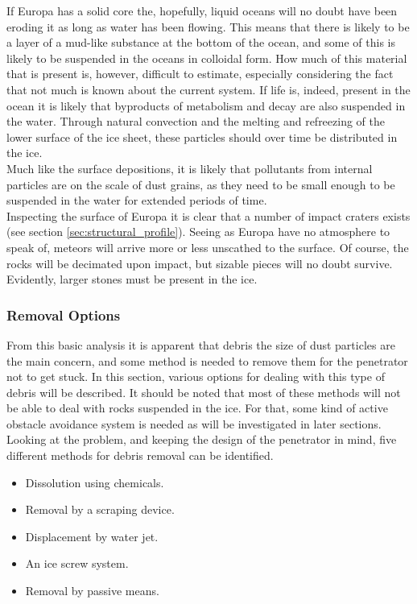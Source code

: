 \noindent
If Europa has a solid core the, hopefully, liquid oceans will no doubt have been eroding it as long as water has been flowing. This means that there is likely to be a layer of a mud-like substance at the bottom of the ocean, and some of this is likely to be suspended in the oceans in colloidal form. How much of this material that is present is, however, difficult to estimate, especially considering the fact that not much is known about the current system. If life is, indeed, present in the ocean it is likely that byproducts of metabolism and decay are also suspended in the water. Through natural convection and the melting and refreezing of the lower surface of the ice sheet, these particles should over time be distributed in the ice. \\
Much like the surface depositions, it is likely that pollutants from internal particles are on the scale of dust grains, as they need to be small enough to be suspended in the water for extended periods of time.\\

\noindent
Inspecting the surface of Europa it is clear that a number of impact craters exists (see section \ref{sec:structural_profile}). Seeing as Europa have no atmosphere to speak of, meteors will arrive more or less unscathed to the surface. Of course, the rocks will be decimated upon impact, but sizable pieces will no doubt survive. Evidently, larger stones must be present in the ice.  \\

\subsubsection{Removal Options}
From this basic analysis it is apparent that debris the size of dust particles are the main concern, and some method is needed to remove them for the penetrator not to get stuck. In this section, various options for dealing with this type of debris will be described. It should be noted that most of these methods will not be able to deal with rocks suspended in the ice. For that, some kind of active obstacle avoidance system is needed as will be investigated in later sections.\\
Looking at the problem, and keeping the design of the penetrator in mind, five different methods for debris removal can  be identified.
\begin{itemize}
	\item Dissolution using chemicals.
	\item Removal by a scraping device.
	\item Displacement by water jet.
	\item An ice screw system.
	\item Removal by passive means.
\end{itemize}

